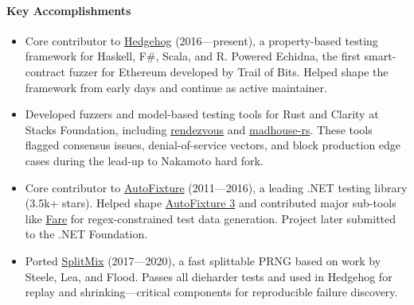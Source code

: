 \documentclass[10pt]{article}
\begin{document}
\paragraph{Key Accomplishments}
\begin{itemize}
\item Core contributor to \href{https://github.com/hedgehogqa}{Hedgehog}
  (2016—present), a property-based testing framework for Haskell, F\#, Scala,
  and R. Powered Echidna, the first smart-contract fuzzer for Ethereum
  developed by Trail of Bits. Helped shape the framework from early days and
  continue as active maintainer.
\item Developed fuzzers and model-based testing tools for Rust and Clarity at
  Stacks Foundation, including
  \href{https://github.com/stacks-network/rendezvous}{rendezvous} and
  \href{https://github.com/stacks-network/madhouse-rs}{madhouse-rs}. These
  tools flagged consensus issues, denial-of-service vectors, and block
  production edge cases during the lead-up to Nakamoto hard fork.
\item Core contributor to
  \href{https://github.com/AutoFixture/AutoFixture}{AutoFixture} (2011—2016),
  a leading .NET testing library (3.5k+ stars). Helped shape
  \href{https://blog.ploeh.dk/2013/03/01/AutoFixture3/}{AutoFixture 3} and
  contributed major sub-tools like
  \href{https://github.com/moodmosaic/Fare}{Fare} for regex-constrained test
  data generation. Project later submitted to the .NET Foundation.
\item Ported \href{https://github.com/moodmosaic/splitmix}{SplitMix}
  (2017—2020), a fast splittable PRNG based on work by Steele, Lea, and Flood.
  Passes all dieharder tests and used in Hedgehog for replay and
  shrinking—critical components for reproducible failure discovery.
\end{itemize}
\end{document}
